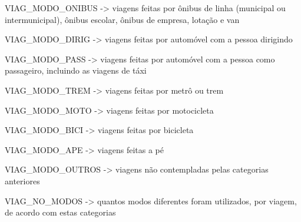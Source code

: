 \begin{compactitem}
    \begin{compactitem}[]
    \item VIAG_MODO_ONIBUS -> viagens feitas por ônibus de linha (municipal ou intermunicipal), ônibus escolar, ônibus de empresa, lotação e van
    \item VIAG_MODO_DIRIG -> viagens feitas por automóvel com a pessoa dirigindo
    \item VIAG_MODO_PASS -> viagens feitas por automóvel com a pessoa como passageiro, incluindo as viagens de táxi
    \item VIAG_MODO_TREM -> viagens feitas por metrô ou trem
    \item VIAG_MODO_MOTO -> viagens feitas por motocicleta
    \item VIAG_MODO_BICI -> viagens feitas por bicicleta
    \item VIAG_MODO_APE -> viagens feitas a pé
    \item VIAG_MODO_OUTROS -> viagens não contempladas pelas categorias anteriores
    \item VIAG_NO_MODOS -> quantos modos diferentes foram utilizados, por viagem, de acordo com estas categorias
    \end{compactitem}\


\end{compactitem}
